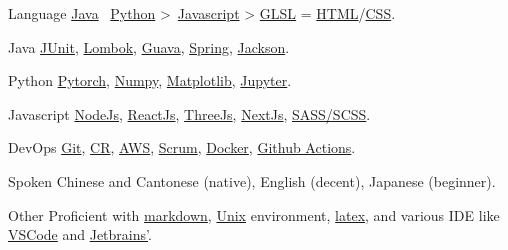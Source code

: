 
\begin{cvskills}
  \cvskill
    {Language}
    {\href{https://www.java.com/en/}{Java} \approx\, \href{https://www.python.org/}{Python} >\, \href{https://www.javascript.com/}{Javascript} > \href{https://www.khronos.org/opengl/wiki/OpenGL_Shading_Language}{GLSL} = \href{https://developer.mozilla.org/en-US/docs/Glossary/HTML5}{HTML}/\href{https://developer.mozilla.org/en-US/docs/Web/CSS}{CSS}.}
  
  \cvskill
    {Java} %
    {\href{https://junit.org/junit4/}{JUnit}, \href{https://projectlombok.org/}{Lombok}, \href{https://github.com/google/guava}{Guava}, \href{https://spring.io/}{Spring}, \href{https://github.com/FasterXML/jackson}{Jackson}.}  %

  \cvskill
    {Python} %
    {\href{https://pytorch.org/}{Pytorch}, \href{https://numpy.org/}{Numpy}, \href{https://matplotlib.org/}{Matplotlib}, \href{https://jupyter.org/}{Jupyter}.}  %

  \cvskill
    {Javascript} %
    {\href{https://nodejs.org/en/}{NodeJs}, \href{https://reactjs.org/}{ReactJs}, \href{https://threejs.org/}{ThreeJs}, \href{https://nextjs.org/}{NextJs}, \href{https://sass-lang.com/}{SASS/SCSS}.}
  
  \cvskill
    {DevOps} %
    {\href{https://git-scm.com/}{Git}, \href{https://en.wikipedia.org/wiki/Code_review}{CR}, \href{https://aws.amazon.com/}{AWS}, \href{https://www.scrum.org/resources/what-is-scrum}{Scrum}, \href{https://www.docker.com/}{Docker}, \href{https://github.com/features/actions}{Github Actions}.}
 
  \cvskill
    {Spoken}
    {Chinese and Cantonese (native), English (decent), Japanese (beginner).}

  \cvskill
    {Other} %
    {Proficient with \href{https://en.wikipedia.org/wiki/Markdown}{markdown}, \href{https://en.wikipedia.org/wiki/Unix}{Unix} environment, \href{https://www.latex-project.org/}{latex}, and various IDE like \href{https://code.visualstudio.com/}{VSCode} and \href{https://www.jetbrains.com/}{Jetbrains'}.}

\end{cvskills}
